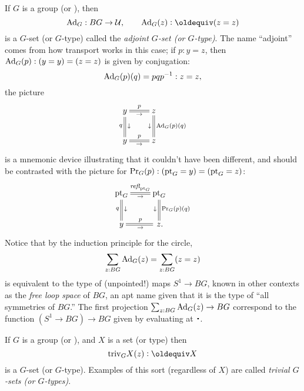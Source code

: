\begin{example}\label{def:adjointrep}
  If $G$ is a group (or \inftygp), then
$$\Ad_G:BG\to\UU,\qquad\Ad_G(z)\defequi(z=z)$$ is a $G$-set (or $G$-type) called the \emph{adjoint $G$-set (or $G$-type)}.  The name ``adjoint'' comes from how transport works in this case; if $p:y=z$, then $\mathrm{Ad}_G(p):(y=y)=(z=z)$ is given by conjugation: 
$$\mathrm{Ad}_G(p)(q)=pqp^{-1}:z=z,$$ the picture
$$\xymatrix{y\ar@{=}[r]^p_\to\ar@{=}[d]_q^\downarrow&z\ar@{=}[d]^{\Ad_G(p)(q)}_\downarrow\\
y\ar@{=}[r]^p_\to&z}$$
is a mnemonic device illustrating that it couldn't have been different, and should be contrasted with the picture for $\mathrm{Pr}_{{G}} (p):({\mathord{\mathrm{pt}}}_G=y)=({\mathord{\mathrm{pt}}}_G=z)$:
$$\xymatrix{\pt_G\ar@{=}[r]^{\refl{\pt_G}}_\to\ar@{=}[d]_q^\downarrow&\pt_G\ar@{=}[d]^{\princ G(p)(q)}_\downarrow\\
y\ar@{=}[r]^p_\to&\,z.}$$  
Notice that by the induction principle for the circle,
$$\sum_{z:BG}\mathrm{Ad}_G(z)=\sum_{z:BG}(z=z)$$
is equivalent to the type of (unpointed!) maps $S^1\to BG$, known in other contexts as the \emph{free loop space} of $BG$, an apt name given that it is the type of ``all symmetries of $BG$.''  
The first projection $\sum_{z:BG}\mathrm{Ad}_G(z)\to BG$ correspond to the function $(S^1\to BG)\to BG$ given by evaluating at $\base$. 
\end{example}
\begin{example}\label{def:trivGset}
  If $G$ is a group (or \inftygp), and $X$ is a set (or type) then
$$\mathrm{triv}_GX(z)\defequi X$$ is a $G$-set (or $G$-type).  Examples of this sort (regardless of $X$) are called \emph{trivial $G$-sets (or $G$-types)}.
\end{example}

